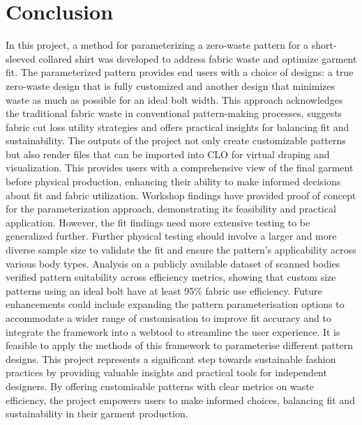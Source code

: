 \chapter{Conclusion}

In this project, a method for parameterizing a zero-waste pattern for a short-sleeved collared shirt was developed to address fabric waste and optimize garment fit. The parameterized pattern provides end users with a choice of designs: a true zero-waste design that is fully customized and another design that minimizes waste as much as possible for an ideal bolt width. This approach acknowledges the traditional fabric waste in conventional pattern-making processes, suggests fabric cut loss utility strategies and offers practical insights for balancing fit and sustainability. The outputs of the project not only create customizable patterns but also render files that can be imported into CLO for virtual draping and visualization. This provides users with a comprehensive view of the final garment before physical production, enhancing their ability to make informed decisions about fit and fabric utilization. Workshop findings have provided proof of concept for the parameterization approach, demonstrating its feasibility and practical application. However, the fit findings need more extensive testing to be generalized further. Further physical testing should involve a larger and more diverse sample size to validate the fit and ensure the pattern's applicability across various body types. Analysis on a publicly available dataset of scanned bodies verified pattern suitability across efficiency metrics, showing that custom size patterns using an ideal bolt have at least 95\% fabric use efficiency. Future enhancements could include expanding the pattern parameterisation options to accommodate a wider range of customisation to improve fit accuracy and to integrate the framework into a webtool to streamline the user experience. It is feasible to apply the methods of this framework to parameterise different pattern designs. This project represents a significant step towards sustainable fashion practices by providing valuable insights and practical tools for independent designers. By offering customisable patterns with clear metrics on waste efficiency, the project empowers users to make informed choices, balancing fit and sustainability in their garment production.